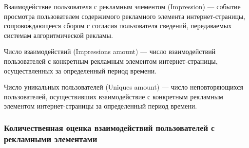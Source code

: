 Взаимодействие пользователя с рекламным элементом (Impression) --- событие просмотра пользователем содержимого
рекламного элемента интернет-страницы, сопровождающееся сбором с согласия пользователя сведений, передаваемых 
системам алгоритмической рекламы.

Число взаимодействий (Impressions amount) --- число взаимодействий пользователей с конкретным рекламным элементом
интернет-страницы, осуществленных за определенный период времени.

Число уникальных пользователей (Uniques amount) --- число неповторяющихся пользователей, осуществивших взаимодействие
с конкретным рекламным элементом интернет-страницы за определенный период времени.

\subsubsection{Количественная оценка взаимодействий пользователей с рекламными элементами}

